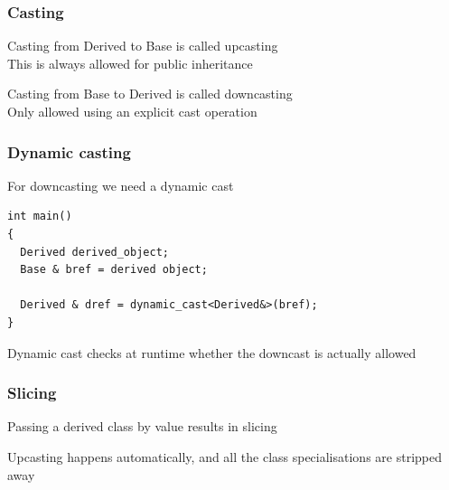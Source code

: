 \documentclass[14pt,a4paper,dvipsnames,usenames]{beamer}
\begin{document}
\begin{frame}[fragile]
  \frametitle{Casting}

  Casting from Derived to Base is called upcasting\\[5pt]
  This is always allowed for public inheritance

  \vspace{1cm}
  Casting from Base to Derived is called downcasting\\[5pt]
  Only allowed using an explicit cast operation
  
\end{frame}

\begin{frame}[fragile]
  \frametitle{Dynamic casting}

  For downcasting we need a dynamic cast

  \vspace{.5em}
  \begin{lstlisting}[morekeywords={Base,Derived}]
int main()
{
  Derived derived_object;
  Base & bref = derived object;

  Derived & dref = dynamic_cast<Derived&>(bref);
}
  \end{lstlisting}

  \vspace{.5em}
  Dynamic cast checks at runtime whether the downcast is actually allowed
  
\end{frame}

\begin{frame}[fragile]
  \frametitle{Slicing}

  Passing a derived class by value results in slicing

  \vspace{1.5cm}
  Upcasting happens automatically, and all the class specialisations are stripped away

  \nointerlineskip

  
\end{frame}
\end{document}
